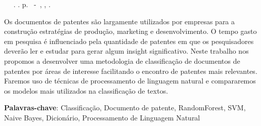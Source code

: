 \setlength{\absparsep}{18pt} %
\begin{resumo}
	\begin{flushleft} 
			\setlength{\absparsep}{0pt} %
			\SingleSpacing 
			\imprimirautorabr~ ~\textbf{\imprimirtitulo}.	\imprimirdata. \pageref{LastPage}p. 
			\imprimirtipotrabalho~-~\imprimirinstituicao, \imprimirlocal, \imprimirdata. 
 	\end{flushleft}
\OnehalfSpacing 			
Os documentos de patentes são largamente utilizados por empresas para a construção estratégias de produção, marketing e desenvolvimento. O tempo gasto em pesquisa é influenciado pela quantidade de patentes em que os pesquisadores deverão ler e estudar para gerar algum insight significativo. Neste trabalho nos propomos a desenvolver uma metodologia de classificação de documentos de patentes por áreas de interesse facilitando o encontro de patentes mais relevantes. Faremos uso de técnicas de processamento de linguagem natural e compararemos os modelos mais utilizados na classificação de textos.
 

 \textbf{Palavras-chave}: Classificação, Documento de patente, RandomForest, SVM, Naive Bayes, Dicionário, Processamento de Linguagem Natural
\end{resumo}